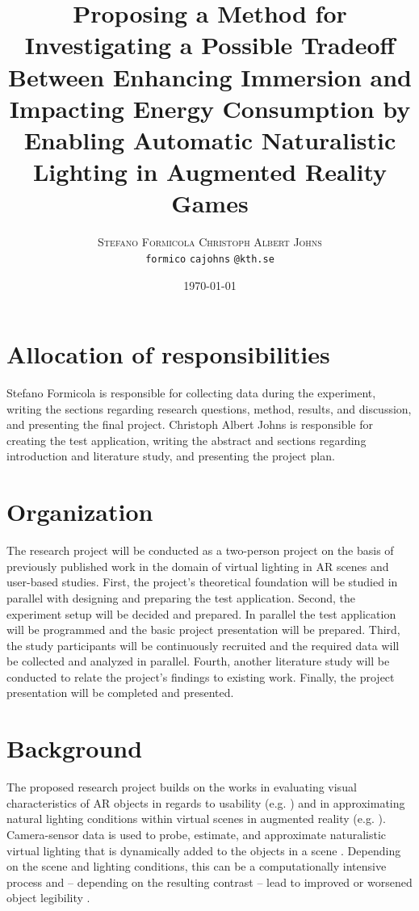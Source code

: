 \documentclass[12pt,twoside,english]{article}
\title{Proposing a Method for Investigating a Possible Tradeoff Between Enhancing Immersion and Impacting Energy Consumption by Enabling Automatic Naturalistic Lighting in Augmented Reality Games}
\author{
        \textsc{Stefano Formicola}
            \qquad
        \textsc{Christoph Albert Johns}
        \mbox{}\\
        \normalsize
            \texttt{formico}
        \textbar{}
            \texttt{cajohns}
        \normalsize
            \texttt{@kth.se}
}
\date{\today}
\begin{document}
\maketitle






\section{Allocation of responsibilities}
\label{sect:alloc_responsibilities}

Stefano Formicola is responsible for collecting data during the experiment, writing the sections regarding research questions, method, results, and discussion, and presenting the final project.
Christoph Albert Johns is responsible for creating the test application, writing the abstract and sections regarding introduction and literature study, and presenting the project plan.


\section{Organization}
\label{sect:organization}

The research project will be conducted as a two-person project on the basis of previously published work in the domain of virtual lighting in \gls{AR} scenes and user-based studies.
First, the project's theoretical foundation will be studied in parallel with designing and preparing the test application.
Second, the experiment setup will be decided and prepared. In parallel the test application will be programmed and the basic project presentation will be prepared.
Third, the study participants will be continuously recruited and the required data will be collected and analyzed in parallel.
Fourth, another literature study will be conducted to relate the project's findings to existing work.
Finally, the project presentation will be completed and presented.


\section{Background}
\label{sect:background}
The proposed research project builds on the works in evaluating visual characteristics of \gls{AR} objects in regards to usability (e.g. \cite{gabbard_effects_2006}) and in approximating natural lighting conditions within virtual scenes in augmented reality (e.g. \cite{aittala_inverse_2010}).
Camera-sensor data is used to probe, estimate, and approximate naturalistic virtual lighting that is dynamically added to the objects in a scene \cite{apple_arlightestimate_nodate,apple_pointlight_nodate}.
Depending on the scene and lighting conditions, this can be a computationally intensive process \cite{steed_constructing_2016} and -- depending on the resulting contrast -- lead to improved or worsened object legibility \cite{gabbard_effects_2006}.
\end{document}
